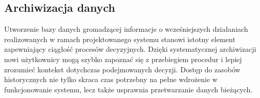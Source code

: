 \subsection{Archiwizacja danych}
Utworzenie bazy danych gromadzącej informacje o wcześniejszych działaniach realizowanych w ramach projektowanego systemu stanowi istotny element zapewniający ciągłość procesów decyzyjnych. Dzięki systematycznej archiwizacji nowi użytkownicy mogą szybko zapoznać się z przebiegiem procedur i lepiej zrozumieć kontekst dotychczas podejmowanych decyzji. Dostęp do zasobów historycznych nie tylko skraca czas potrzebny na pełne wdrożenie w funkcjonowanie systemu, lecz także usprawnia przetwarzanie danych bieżących.

\begin{comment}
Utworzenie bazy danych zawierającej dane historyczne jest ważne w kontekście projektowanego systemu.

Ma ona za zadanie zapewnić ciągłość procesów decyzyjnych. Archiwizacja danych umożliwia nowym użytkownikom szybkie zapoznanie się z procesem, jego historią oraz podejmowanymi wcześniej decyzjami. Dzięki dostępowi do danych historycznych możliwe jest zrozumienie kontekstu wcześniejszych działań, co znacząco skraca czas potrzebny na wdrożenie się do pracy z systemem.

Zarchiwizowane dane stanowią podstawę do tworzenia raportów dotyczących budżetu oraz kosztów usług IT na przestrzeni lat. Analiza trendów, porównanie wyników oraz identyfikacja obszarów wymagających optymalizacji stają się możliwe dzięki dostępowi do historycznych informacji.

Dane archiwalne pozwalają na obiektywne podejmowanie decyzji, opartych na analizie wcześniejszych wyników. Dzięki temu użytkownicy mogą unikać powtarzania błędów oraz skutecznie przewidywać potencjalne konsekwencje podejmowanych działań.
\end{comment}